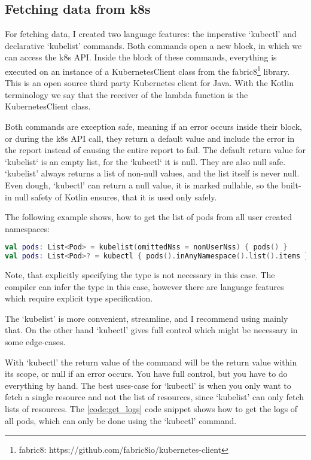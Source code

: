 \subsection{Fetching data from k8s}

For fetching data, I created two language features: the imperative `kubectl' and declarative `kubelist' commands. Both commands open a new block, in which we can access the k8s API. Inside the block of these commands, everything is executed on an instance of a KubernetesClient class from the fabric8\footnote{fabric8: https://github.com/fabric8io/kubernetes-client} library. This is an open source third party Kubernetes client for Java. With the Kotlin terminology we say that the receiver of the lambda function is the KubernetesClient class.

Both commands are exception safe, meaning if an error occurs inside their block, or during the k8s API call, they return a default value and include the error in the report instead of causing the entire report to fail. The default return value for `kubelist` is an empty list, for the `kubectl` it is null. They are also null safe. `kubelist' always returns a list of non-null values, and the list itself is never null. Even dough, `kubectl' can return a null value, it is marked nullable, so the built-in null safety of Kotlin ensures, that it is used only safely.

The following example shows, how to get the list of pods from all user created namespaces:

\begin{lstlisting}[caption={Usage of kubelist and kubectl},language=Kotlin,label=code:kubelist_usage]
val pods: List<Pod> = kubelist(omittedNss = nonUserNss) { pods() }
val pods: List<Pod>? = kubectl { pods().inAnyNamespace().list().items }?.filter { it.metadata.namespace !in nonUserNss }
\end{lstlisting}

Note, that explicitly specifying the type is not necessary in this case. The compiler can infer the type in this case, however there are language features which require explicit type specification.

The `kubelist' is more convenient, streamline, and I recommend using mainly that. On the other hand `kubectl' gives full control which might be necessary in some edge-cases.

With `kubectl' the return value of the command will be the return value within its scope, or null if an error occurs. You have full control, but you have to do everything by hand. The best uses-case for `kubectl' is when you only want to fetch a single resource and not the list of resources, since `kubelist' can only fetch lists of resources. The \ref{code:get_logs} code snippet shows how to get the logs of all pods, which can only be done using the `kubectl' command.

